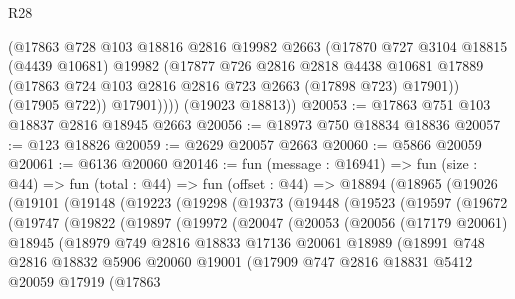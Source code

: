 \begin{lexlean}{R28}
\begin{coremodule}
            (@17863
              @728
              @103
              @18816
              @2816
              @19982
              @2663
              (@17870
                @727
                @3104
                @18815
                (@4439 @10681)
                @19982
                (@17877
                  @726
                  @2816
                  @2818
                  @4438
                  @10681
                  @17889
                  (@17863 @724 @103 @2816 @2816 @723 @2663 (@17898 @723) @17901))
                (@17905 @722))
              @17901))))
      (@19023 @18813))
@20053 := @17863 @751 @103 @18837 @2816 @18945 @2663
@20056 := @18973 @750 @18834 @18836
@20057 := @123 @18826
@20059 := @2629 @20057 @2663
@20060 := @5866 @20059
@20061 := @6136 @20060
@20146 := fun (message : @16941) =>
  fun (size : @44) =>
  fun (total : @44) =>
  fun (offset : @44) =>
  @18894
    (@18965
      (@19026
        (@19101
          (@19148
            (@19223
              (@19298
                (@19373
                  (@19448
                    (@19523
                      (@19597
                        (@19672
                          (@19747
                            (@19822
                              (@19897
                                (@19972
                                  (@20047
                                    (@20053
                                      (@20056
                                        (@17179 @20061)
                                        @18945
                                        (@18979
                                          @749
                                          @2816
                                          @18833
                                          @17136
                                          @20061
                                          @18989
                                          (@18991
                                            @748
                                            @2816
                                            @18832
                                            @5906
                                            @20060
                                            @19001
                                            (@17909
                                              @747
                                              @2816
                                              @18831
                                              @5412
                                              @20059
                                              @17919
                                              (@17863

\end{coremodule}
\end{lexlean}
